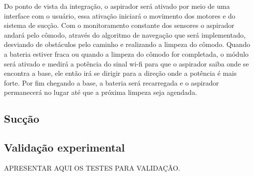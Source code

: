     	Do ponto de vista da integração, o aspirador será ativado por meio de uma interface com o usuário, essa ativação iniciará o movimento dos motores e do sistema de sucção. Com o monitoramento constante dos sensores o aspirador andará pelo cômodo, através do algoritmo de navegação que será implementado, desviando de obstáculos pelo caminho e realizando a limpeza do cômodo. Quando a bateria estiver fraca ou quando a limpeza do cômodo for completada, o módulo será ativado e medirá a potência do sinal wi-fi para que o aspirador saiba onde se encontra a base, ele então irá se dirigir para a direção onde a potência é mais forte. Por fim chegando a base, a bateria será recarregada e o aspirador permanecerá no lugar até que a próxima limpeza seja agendada.  

	\subsection{Sucção}
	\label{sub:plano_sucção}



\subsection{Validação experimental} %
	\label{sub:validação_experimental}

	APRESENTAR AQUI OS TESTES PARA VALIDAÇÃO.
